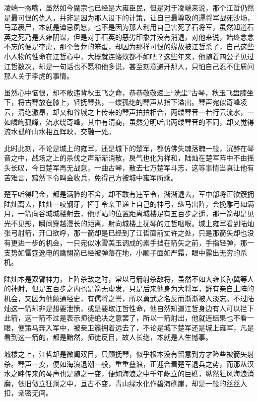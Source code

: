 凌端一撇嘴，虽然如今魔宗也已经是大雍臣民，但是对于凌端来说，那个江哲仍然是最可恨的仇人，并非是因为那人设下的计策，让自己最尊敬的谭将军战死沙场，马革裹尸，本就是谭忌夙愿，也不是因为那人利用自己害死了石将军，虽然知道石英之死乃是大雍阴谋，但是对于石英的恶劣印象并没有消退，对他来说，始终念念不忘的便是李虎，那个鲁莽的笨蛋，却因为那样可恨的缘故被江哲杀了，自己这些小人物的性命在江哲心中，大概就连蝼蚁都不如吧？这些年来，他随着四公子见过江哲数次，却是一句话也不愿和他多说，甚至刻意避开那人，只怕自己忍不住质问那人关于李虎的事情。

虽然心中恼恨，却不敢违背秋玉飞之命，恭恭敬敬递上“洗尘”古琴，秋玉飞盘膝坐下，将古琴放在膝上，轻抚琴弦，一缕孤绝的琴声从指下溢出。琴声宛似奇峰凌云，清绝激昂，却又和谷城之上传来的琴声拍拍相合，两缕琴音一若行云流水，一如嶙峋孤峰，流水绕奇峰，其中有清商，虽然分明听出两缕琴音的不同，却又觉得流水孤峰山水相互辉映，交融一处。

此时此刻，不论是城上的雍军，还是城下的楚军，都仿佛失魂落魄一般，沉醉在琴音之中，战场之上的杀伐之声渐渐消散，戾气也化为祥和，陆灿在楚军阵中不由摇头长叹，今日楚军再无战意，一曲古琴，散去七万楚军斗志，这等事情当真让他有苦难言，黯然下令鸣金收兵，免得己方被城中雍军所乘。

楚军听得鸣金，都是满脸的不舍，却不敢有违军令，渐渐退去，军中部将正欲簇拥陆灿离去，陆灿一咬钢牙，挥手令亲卫递上自己的神弓，纵马出阵，会挽雕弓如满月，一箭向谷城城楼射去，他所站的位置距离城楼足有五百步之遥，那一箭却是见光不见影，瞬间穿越漫长的距离，射向城楼上抚琴的江哲咽喉。城上雍军看到陆灿张弓射箭，开口欲呼，那一箭却是已经到了江哲面前丈许之处，只是那箭矢却也没有更进一步的机会，一只宛似冰雪美玉调成的素手挡在箭矢之前，手指轻弹，那一支势如雷霆逸电的鹰翎箭已经被弹落在地，小顺子面如严霜，眼中露出无穷的杀机。

陆灿本是双臂神力，上阵杀敌之时，常以弓箭射杀敌将，虽然不如大雍长孙冀等人的神射，但是五百步之内也是箭无虚发，只是后来他身为大将军，鲜有亲自上阵的机会，又因为他颇通经史，有儒将之誉，所以勇武之名反而渐渐被人淡忘。不过陆灿这一箭却非是想要泄愤，或是要取江哲性命，他自然知道江哲身边有人可以拦下此箭，这一箭不过是表示师徒绝决之意罢了，所以一箭射出，他就连结果也不看一眼，便策马奔入军中，被亲卫簇拥着远去了，不论是城下楚军还是城上雍军，凡是看到这一箭的，都是黯然，师徒反目，故人长绝，本就是人生憾事。

城楼之上，江哲却是微阖双目，只顾抚琴，似乎根本没有留意到方才险些被箭矢射杀。琴声一变，便如海浪退潮一般，重重叠浪，正迎合着楚军退兵之势，而那从汉水之畔传来的琴声也是随之一变，便如海浪之中千年屹立的巨礁，纵然狂风海浪消磨，依旧傲立狂澜之中，亘古不变，青山绿水化作碧海礁崖，却是一般的丝丝入扣，亲密无间。


